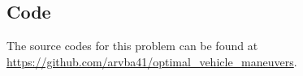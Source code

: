 

\subsection{Code}
The source codes for this problem can be found at \newline \href{https://github.com/arvba41/optimal_vehicle_maneuvers/blob/main/uppgift/ugf5/force_centric_and_scenario_centric_PM.m}{https://github.com/arvba41/optimal\_vehicle\_maneuvers}.